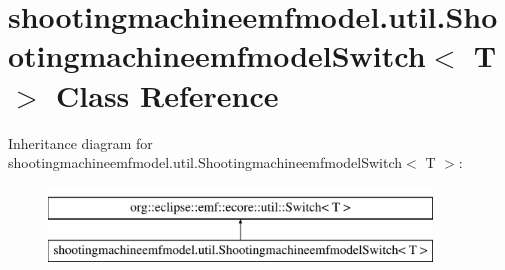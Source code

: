 \hypertarget{classshootingmachineemfmodel_1_1util_1_1_shootingmachineemfmodel_switch_3_01_t_01_4}{\section{shootingmachineemfmodel.\-util.\-Shootingmachineemfmodel\-Switch$<$ T $>$ Class Reference}
\label{classshootingmachineemfmodel_1_1util_1_1_shootingmachineemfmodel_switch_3_01_t_01_4}
}
Inheritance diagram for shootingmachineemfmodel.\-util.\-Shootingmachineemfmodel\-Switch$<$ T $>$\-:\begin{figure}[H]
\begin{center}
\leavevmode
\includegraphics[height=2.000000cm]{classshootingmachineemfmodel_1_1util_1_1_shootingmachineemfmodel_switch_3_01_t_01_4}
\end{center}
\end{figure}
